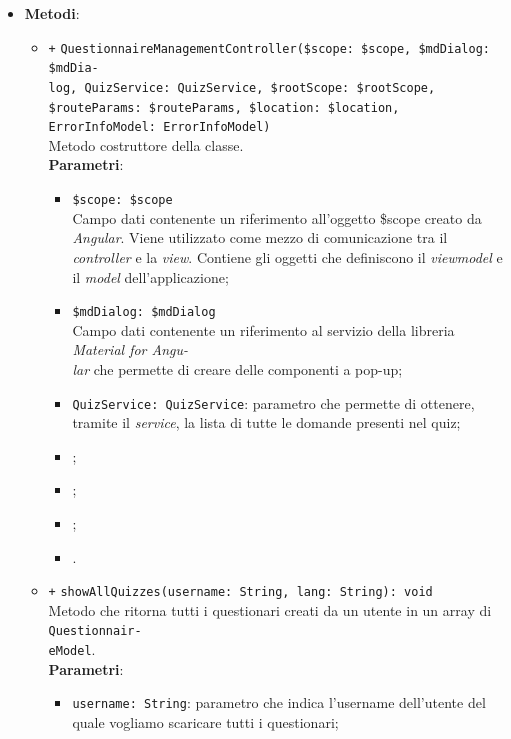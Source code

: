 \begin{itemize}
\begin{itemize}
		\item \routeparamsA;
		\item \locationA;
		\item \errorinfomodelA.
	\end{itemize}
	\item \textbf{Metodi}:
	\begin{itemize}
		\item \texttt{+} \texttt{QuestionnaireManagementController(\$scope: \$scope, \$mdDialog: \$mdDia-\\log, QuizService: QuizService, \$rootScope: \$rootScope, \$routeParams: \$routeParams, \$location: \$location, ErrorInfoModel: ErrorInfoModel)} \\Metodo costruttore della classe.\\
		\textbf{Parametri}: 
		\begin{itemize}
			\item \texttt{\$scope: \$scope} \\
			Campo dati contenente un riferimento all'oggetto \$scope creato da \textit{Angular}. Viene utilizzato come mezzo di comunicazione tra il \textit{controller} e la \textit{view}. Contiene gli oggetti che definiscono il \textit{viewmodel} e il \textit{model} dell'applicazione;
			\item \texttt{\$mdDialog: \$mdDialog} \\
			Campo dati contenente un riferimento al servizio della libreria \textit{Material for Angu-\\lar{}} che permette di creare delle componenti a pop-up;
			\item \texttt{QuizService: QuizService}: parametro che permette di ottenere, tramite il \textit{service}, la lista di tutte le domande presenti nel quiz;
			\item \rootscopeP;
			\item \routeparamsP;
			\item \locationP;
			\item \errorinfomodelP.
		\end{itemize}
		\item \texttt{+} \texttt{showAllQuizzes(username: String, lang: String): void} \\Metodo che ritorna tutti i questionari creati da un utente in un array di \texttt{Questionnair-\\eModel}. \\
		\textbf{Parametri}:
		\begin{itemize}
			\item \texttt{username: String}: parametro che indica l'username dell'utente del quale vogliamo scaricare tutti i questionari;

\end{itemize}
\end{itemize}
\end{itemize}
